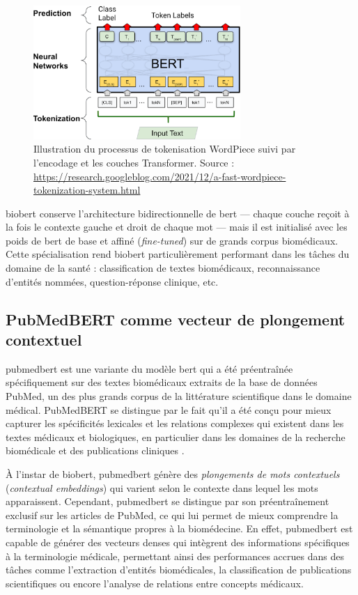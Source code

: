 \documentclass[12pt]{report}
\begin{document}
\begin{figure}[H]
    \centering
    \includegraphics[width=0.7\textwidth]{tokenization_bert.png}
    \caption{Illustration du processus de tokenisation WordPiece suivi par l'encodage et les couches Transformer. Source : \url{https://research.googleblog.com/2021/12/a-fast-wordpiece-tokenization-system.html}}
    \label{fig:wordpiece}
\end{figure}

\gls{biobert} conserve l’architecture bidirectionnelle de \gls{bert} — chaque couche reçoit à la fois le contexte gauche et droit de chaque mot — mais il est initialisé avec les poids de \gls{bert} de base et affiné (\textit{fine-tuned}) sur de grands corpus biomédicaux. Cette spécialisation rend \gls{biobert} particulièrement performant dans les tâches du domaine de la santé : classification de textes biomédicaux, reconnaissance d'entités nommées, question-réponse clinique, etc.

\subsection{PubMedBERT comme vecteur de plongement contextuel}

\gls{pubmedbert} est une variante du modèle \gls{bert} qui a été préentraînée spécifiquement sur des textes biomédicaux extraits de la base de données PubMed, un des plus grands corpus de la littérature scientifique dans le domaine médical. PubMedBERT se distingue par le fait qu'il a été conçu pour mieux capturer les spécificités lexicales et les relations complexes qui existent dans les textes médicaux et biologiques, en particulier dans les domaines de la recherche biomédicale et des publications cliniques \cite{gu2020domain}. 

À l’instar de \gls{biobert}, \gls{pubmedbert} génère des \textit{plongements de mots contextuels} (\textit{contextual embeddings}) qui varient selon le contexte dans lequel les mots apparaissent. Cependant, \gls{pubmedbert} se distingue par son préentraînement exclusif sur les articles de PubMed, ce qui lui permet de mieux comprendre la terminologie et la sémantique propres à la biomédecine. En effet, \gls{pubmedbert} est capable de générer des vecteurs denses qui intègrent des informations spécifiques à la terminologie médicale, permettant ainsi des performances accrues dans des tâches comme l’extraction d’entités biomédicales, la classification de publications scientifiques ou encore l’analyse de relations entre concepts médicaux.
\end{document}
